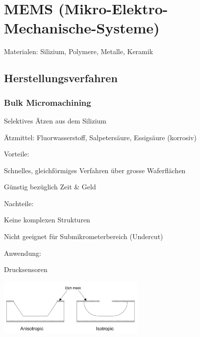 \section {MEMS (Mikro-Elektro-Mechanische-Systeme)}
\begin{compactitem}
    \item Materialen: Silizium, Polymere, Metalle, Keramik
\end{compactitem}


\subsection{Herstellungsverfahren}
\subsubsection{Bulk Micromachining}
\begin{multicols}{2}
    \begin{compactitem}
      \item Selektives Ätzen aus dem Silizium
      \item Ätzmittel: Fluorwasserstoff, Salpetersäure, Essigsäure (korrosiv)
      \item Vorteile:
      \begin{compactitem}
          \item Schnelles, gleichförmiges Verfahren über grosse Waferflächen
          \item Günstig bezüglich Zeit & Geld
      \end{compactitem}
      \item Nachteile:
      \begin{compactitem}
          \item Keine komplexen Strukturen
          \item Nicht geeignet für Submikrometerbereich (Undercut)
      \end{compactitem}
      \item Anwendung:
      \begin{compactitem}
          \item Drucksensoren
      \end{compactitem}
    \end{compactitem}

    \includegraphics[width=0.54\textwidth]{images/Bulk_Micro}
\end{multicols}



